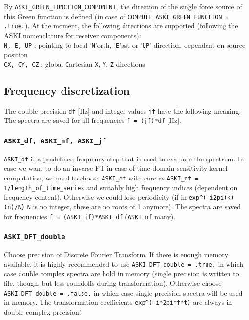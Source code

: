 \documentclass[12pt,a4paper]{article}
\newcommand{\lcode}[1]{\nolinkurl{#1}}
\newcommand{\ASKI}{ {\ttfamily ASKI} }
\begin{document}
By \lcode{ASKI_GREEN_FUNCTION_COMPONENT}, the direction of the single force source of this Green function is 
defined (in case of \lcode{COMPUTE_ASKI_GREEN_FUNCTION = .true.}).
At the moment, the following directions are supported (following the \ASKI nomenclature for receiver components):\\
\lcode{N, E, UP} : pointing to local '\lcode{N}'orth, '\lcode{E}'ast or '\lcode{UP}' direction, dependent on 
source position\\
\lcode{CX, CY, CZ} : global \lcode{C}artesian \lcode{X}, \lcode{Y}, \lcode{Z} directions

\subsection{Frequency discretization}
The double precision \lcode{df} [Hz] and integer values \lcode{jf} have the following meaning:
The spectra are saved for all frequencies \lcode{f = (jf)*df} [Hz].
\subsubsection*{\lcode{ASKI_df, ASKI_nf, ASKI_jf}}
\lcode{ASKI_df} is a predefined frequency step that is used to evaluate the spectrum. In case we want to do 
an inverse FT in case of time-domain sensitivity kernel computation, we need to choose \lcode{ASKI_df} with care 
as \lcode{ASKI_df = 1/length_of_time_series} and suitably high frequency indices (dependent on frequency content).
Otherwise we could lose periodicity (if in \lcode{exp^(-i2pi(k)(n)/N)} \lcode{N} is no integer, these are no 
roots of 1 anymore). The spectra are saved for frequencies \lcode{f = (ASKI_jf)*ASKI_df} (\lcode{ASKI_nf} many).
\subsubsection*{\lcode{ASKI_DFT_double}}
Choose precision of Discrete Fourier Transform. If there is enough memory available, it is highly recommended
to use \lcode{ASKI_DFT_double = .true.} in which case double complex spectra are hold in memory (single precision is 
written to file, though, but less roundoffs during transformation). Otherwise choose \lcode{ASKI_DFT_double = .false.}
in which case single precision spectra will be used in memory. The transformation coefficients \lcode{exp^(-i*2pi*f*t)} 
are always in double complex precision!
\end{document}
